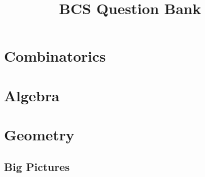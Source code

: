 \documentclass[a4paper, 12pt, oneside]{memoir}
\title{\textbf{BCS Question Bank} \HRule{2pt}\\[.5cm]}
\begin{document}
 \maketitle\vfill \thispagestyle{empty}\newpage
 
 \begingroup{\hypersetup{hidelinks}\tableofcontents}\thispagestyle{empty}\endgroup
 \setcounter{page}{0}


 
 



 \chapter{Combinatorics}
 \thispagestyle{empty}

 
 
 
 
 
 
 
 
 
 
 
 
 
 	
 


 \chapter{Algebra}
 \thispagestyle{empty}

 
 
 
 
 
 


 \chapter{Geometry}
 \thispagestyle{empty}

 
 
 
 
 
 
 
 
 
 
 
 
 
 
 
 

 \section{Big Pictures}
 
\end{document}

